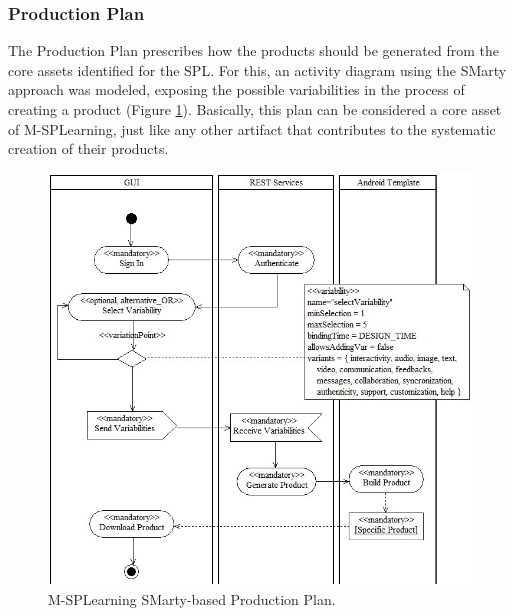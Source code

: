 \subsubsection{Production Plan}

The Production Plan prescribes how the products should be generated from the core assets identified for the SPL. For this, an activity diagram using the SMarty approach was modeled, exposing the possible variabilities in the process of creating a product (Figure \ref{figureMSPLProductionPlan}). Basically, this plan can be considered a core asset of M-SPLearning, just like any other artifact that contributes to the systematic creation of their products.

\begin{figure}
\centering
\includegraphics[scale=0.5]{figures/section3/MSPLProductionPlan}
\caption{M-SPLearning SMarty-based Production Plan.}
\label{figureMSPLProductionPlan}
\end{figure}

